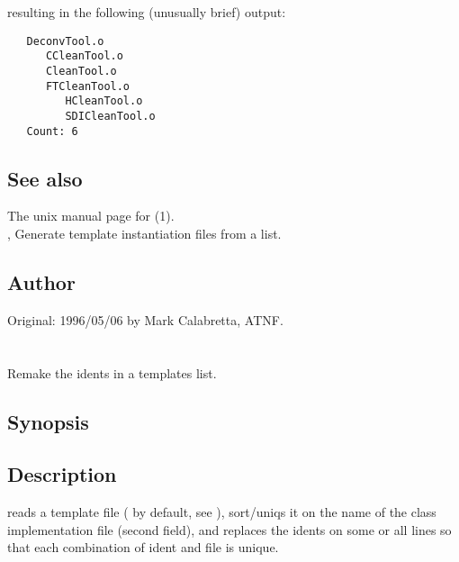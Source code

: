 \noindent
resulting in the following (unusually brief) output:

\begin{verbatim}
   DeconvTool.o
      CCleanTool.o
      CleanTool.o
      FTCleanTool.o
         HCleanTool.o
         SDICleanTool.o
   Count: 6
\end{verbatim}

\subsection*{See also}

The unix manual page for (1).\\
, Generate template instantiation files from a list.

\subsection*{Author}

Original: 1996/05/06 by Mark Calabretta, ATNF.


\newpage
\section{}
\label{reident}

Remake the idents in a templates list.

\subsection*{Synopsis}

\begin{synopsis}
\end{synopsis}

\subsection*{Description}

 reads a template file ( by default, see
), sort/uniqs it on the name of the class implementation
 file (second field), and replaces the idents on some or all lines
so that each combination of ident and  file is unique.

